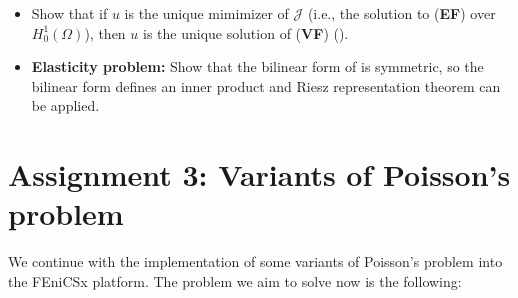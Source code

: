 \begin{kaobox}[frametitle=Solve the following exercices]
\begin{itemize}
\item Show that if $u$ is the unique mimimizer of $\mathcal{J}$
(i.e., the solution to (\textbf{EF}) over $H^1_0(\Omega)$), then $u$ is the
unique solution of (\textbf{VF}) ().\\

\item \textbf{Elasticity problem:} Show that the bilinear form
of  is symmetric, so the bilinear form
defines an inner product and Riesz representation theorem can be applied.\\

\end{itemize}
\end{kaobox}

\section{{\color{gray!50!magenta} Assignment 3: Variants of Poisson's problem}}

We continue with the implementation of some variants of Poisson's problem into
the FEniCSx platform. The problem we aim to solve now is the following:

